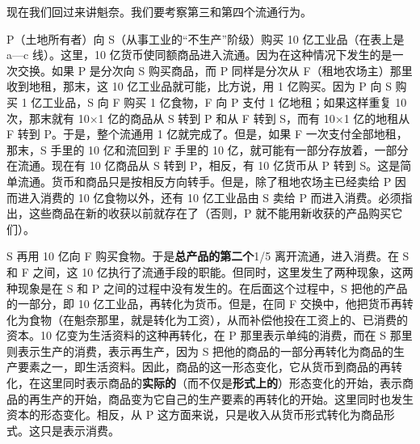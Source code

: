 现在我们回过来讲魁奈。我们要考察第三和第四个流通行为。

P（土地所有者）向 S（从事工业的“不生产”阶级）购买 10 亿工业品（在表上是 a—c 线）。这里，10 亿货币使同额商品进入流通。\fontbox{~\{}因为在这种情况下发生的是一次交换。如果 P 是分次向 S 购买商品，而 P 同样是分次从 F（租地农场主）那里收到地租，那末，这 10 亿工业品就可能，比方说，用 1 亿购买。因为 P 向 S 购买 1 亿工业品，S 向 F 购买 1 亿食物，F 向 P 支付 1 亿地租；如果这样重复 10 次，那末就有 10×1 亿的商品从 S 转到 P 和从 F 转到 S，而有 10×1 亿的地租从 F 转到 P。于是，整个流通用 1 亿就完成了。但是，如果 F 一次支付全部地租，那末，S 手里的 10 亿和流回到 F 手里的 10 亿，就可能有一部分存放着，一部分在流通。\fontbox{\}~}现在有 10 亿商品从 S 转到 P，相反，有 10 亿货币从 P 转到 S。这是简单流通。货币和商品只是按相反方向转手。但是，除了租地农场主已经卖给 P 因而进入消费的 10 亿食物以外，还有 10 亿工业品由 S 卖给 P 而进入消费。必须指出，这些商品在新的收获以前就存在了（否则，P 就不能用新收获的产品购买它们）。

S 再用 10 亿向 F 购买食物。于是\textbf{总产品的第二个}1/5 离开流通，进入消费。在 S 和 F 之间，这 10 亿执行了流通手段的职能。但同时，这里发生了两种现象，这两种现象是在 S 和 P 之间的过程中没有发生的。在后面这个过程中，S 把他的产品的一部分，即 10 亿工业品，再转化为货币。但是，在同 F 交换中，他把货币再转化为食物（在魁奈那里，就是转化为工资），从而补偿他投在工资上的、已消费的资本。10 亿变为生活资料的这种再转化，在 P 那里表示单纯的消费，而在 S 那里则表示生产的消费，表示再生产，因为 S 把他的商品的一部分再转化为商品的生产要素之一，即生活资料。因此，商品的这一形态变化，它从货币到商品的再转化，在这里同时表示商品的\textbf{实际的}（而不仅是\textbf{形式上的}）形态变化的开始，表示商品的再生产的开始，商品变为它自己的生产要素的再转化的开始。这里同时也发生资本的形态变化。相反，从 P 这方面来说，只是收入从货币形式转化为商品形式。这只是表示消费。

